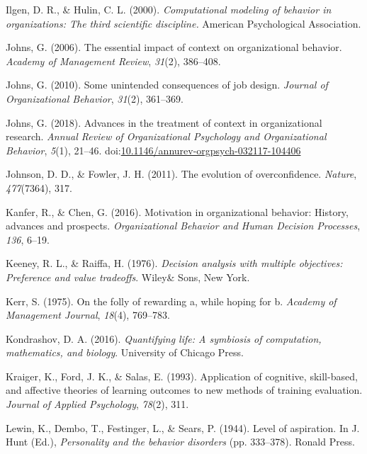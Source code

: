 \documentclass[english,,man]{apa6}
\theoremstyle{definition}
\theoremstyle{definition}
\theoremstyle{definition}
\theoremstyle{remark}
\begin{document}
\leavevmode\hypertarget{ref-Ilgen2000}{}%
Ilgen, D. R., \& Hulin, C. L. (2000). \emph{Computational modeling of
behavior in organizations: The third scientific discipline.} American
Psychological Association.

\leavevmode\hypertarget{ref-johns2006}{}%
Johns, G. (2006). The essential impact of context on organizational
behavior. \emph{Academy of Management Review}, \emph{31}(2), 386--408.

\leavevmode\hypertarget{ref-johns2010}{}%
Johns, G. (2010). Some unintended consequences of job design.
\emph{Journal of Organizational Behavior}, \emph{31}(2), 361--369.

\leavevmode\hypertarget{ref-johns2017}{}%
Johns, G. (2018). Advances in the treatment of context in organizational
research. \emph{Annual Review of Organizational Psychology and
Organizational Behavior}, \emph{5}(1), 21--46.
doi:\href{https://doi.org/10.1146/annurev-orgpsych-032117-104406}{10.1146/annurev-orgpsych-032117-104406}

\leavevmode\hypertarget{ref-johnson2011}{}%
Johnson, D. D., \& Fowler, J. H. (2011). The evolution of
overconfidence. \emph{Nature}, \emph{477}(7364), 317.

\leavevmode\hypertarget{ref-kanfer2016}{}%
Kanfer, R., \& Chen, G. (2016). Motivation in organizational behavior:
History, advances and prospects. \emph{Organizational Behavior and Human
Decision Processes}, \emph{136}, 6--19.

\leavevmode\hypertarget{ref-keeney1976}{}%
Keeney, R. L., \& Raiffa, H. (1976). \emph{Decision analysis with
multiple objectives: Preference and value tradeoffs}. Wiley\& Sons, New
York.

\leavevmode\hypertarget{ref-kerr1975}{}%
Kerr, S. (1975). On the folly of rewarding a, while hoping for b.
\emph{Academy of Management Journal}, \emph{18}(4), 769--783.

\leavevmode\hypertarget{ref-kondrashov2016}{}%
Kondrashov, D. A. (2016). \emph{Quantifying life: A symbiosis of
computation, mathematics, and biology}. University of Chicago Press.

\leavevmode\hypertarget{ref-kraiger1993}{}%
Kraiger, K., Ford, J. K., \& Salas, E. (1993). Application of cognitive,
skill-based, and affective theories of learning outcomes to new methods
of training evaluation. \emph{Journal of Applied Psychology},
\emph{78}(2), 311.

\leavevmode\hypertarget{ref-lewin1944}{}%
Lewin, K., Dembo, T., Festinger, L., \& Sears, P. (1944). Level of
aspiration. In J. Hunt (Ed.), \emph{Personality and the behavior
disorders} (pp. 333--378). Ronald Press.
\end{document}

